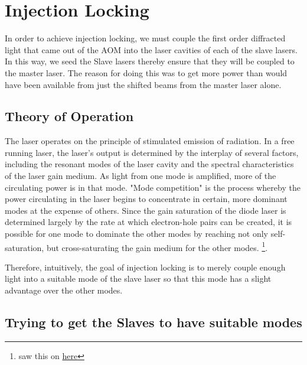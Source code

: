  \chapter{Injection Locking}\label{InjectionLockingChapter}


In order to achieve injection locking, we must couple the first order diffracted light that came out of the AOM into the laser cavities of each of the slave lasers. In this way, we seed the Slave lasers thereby ensure that they will be coupled to the master laser. 
The reason for doing this was to get more power than would have been available from just the shifted beams from the master laser alone. 

\section{Theory of Operation}


The laser operates on the principle of stimulated emission of radiation. In a free running laser, the laser's output is determined by the interplay of several factors, including the resonant modes of the laser cavity and the spectral characteristics of the laser gain medium. As light from one mode is amplified, more of the circulating power is in that mode. 
"Mode competition" is the process whereby the power circulating in the laser begins to concentrate in certain, more dominant modes at the expense of others. Since the gain saturation of the diode laser is determined largely by the rate at which electron-hole pairs can be created, it is possible for one mode to dominate the other modes by reaching not only self-saturation, but cross-saturating the gain medium for the other modes. \footnote{saw this on \href{<http://www.rp-photonics.com/gain_saturation.html>}{here}}. 

Therefore, intuitively, the goal of injection locking is to merely couple enough light into a suitable mode of the slave laser so that this mode has a slight advantage over the other modes. 

\section{Trying to get the Slaves to have suitable modes}

